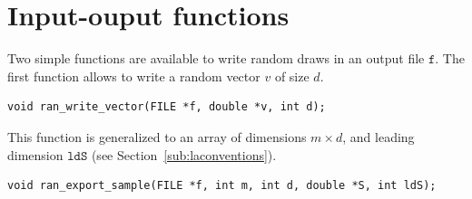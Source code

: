 \section{Input-ouput functions}

Two simple functions are available to write random draws in an output
file $\texttt{f}$.
The first function allows to write a random vector $v$ of size $d$.
\begin{verbatim}
void ran_write_vector(FILE *f, double *v, int d);
\end{verbatim}
This function is generalized to an array of dimensions $m \times d$,
and leading dimension $\texttt{ldS}$ (see
Section~\ref{sub:laconventions}).
\begin{verbatim}
void ran_export_sample(FILE *f, int m, int d, double *S, int ldS);
\end{verbatim}
